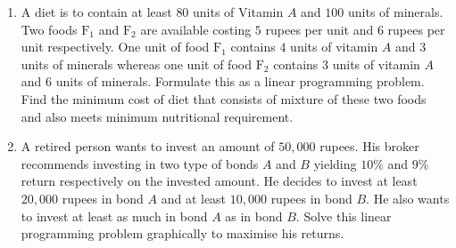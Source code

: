 \begin{enumerate}
	\item A diet is to contain at least $80$ units of Vitamin $A$ and $100$ units of minerals.
	      Two foods $\text{F}_1$ and $\text{F}_2$ are available costing $5$ rupees per unit and $6$ rupees per unit respectively.
	      One unit of food $\text{F}_1$ contains $4$ units of vitamin $A$ and $3$ units of minerals whereas
	      one unit of food $\text{F}_2$ contains $3$ units of vitamin $A$ and $6$ units of minerals.
	      Formulate this as a linear programming problem. Find the minimum cost of diet that consists of mixture of these two foods and also meets minimum nutritional requirement.


	\item  A retired person wants to invest an amount of $50,000$ rupees. His broker recommends investing in two type of bonds $A$ and $B$ yielding $10\%$ and $9\%$ return respectively on the invested amount. He decides to invest at least
	      $20,000$ rupees in bond $A$ and at least $10,000$ rupees in bond $B$. He also wants to invest at least as much in bond $A$ as in bond $B$. Solve this linear programming problem graphically to maximise his returns.


\end{enumerate}
